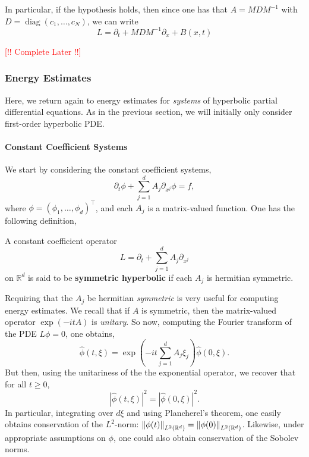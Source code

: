 \documentclass{article}
\begin{document}
In particular, if the hypothesis holds, then since one has that $A = MDM^{-1}$ with $D = \operatorname{diag}(c_{1}, \ldots, c_{N})$, we can write 
\begin{equation*}
	L = \partial_{t} + MDM^{-1}\partial_{x} + B(x, t)
\end{equation*} 

\textcolor{red}{[!! Complete Later !!]}

\subsubsection{Energy Estimates} 

Here, we return again to energy estimates for \textit{systems} of hyperbolic partial differential equations. As in the previous section, we will initially only consider first-order hyperbolic PDE. 

\paragraph{Constant Coefficient Systems} 

We start by considering the constant coefficient systems, 
\begin{equation*}
	\partial_{t}\phi + \sum_{j = 1}^{d}A_{j}\partial_{x^{j}}\phi = f, 
\end{equation*}
where $\phi = (\phi_{1}, \ldots, \phi_{d})^{\top}$, and each $A_{j}$ is a matrix-valued function. One has the following definition, 
\begin{definition}
	A constant coefficient operator 
	\begin{equation*}
		L = \partial_{t} + \sum_{j = 1}^{d}A_{j}\partial_{x^{j}} 
	\end{equation*}
	on $\mathbb{R}^{d}$ is said to be \textbf{symmetric hyperbolic} if each $A_{j}$ is hermitian symmetric. 
\end{definition} 
Requiring that the $A_{j}$ be hermitian \textit{symmetric} is very useful for computing energy estimates. We recall that if $A$ is symmetric, then the matrix-valued operator $\exp(-itA)$ is \textit{unitary}. So now, computing the Fourier transform of the PDE $L\phi = 0$, one obtains, 
\begin{equation*}
	\hat{\phi}(t,\xi) = \exp\left(-it\sum_{j = 1}^{d}A_{j}\xi_{j}\right)\hat{\phi}(0,\xi). 
\end{equation*}
But then, using the unitariness of the the exponential operator, we recover that for all $t \geq 0$, 
\begin{equation*}
	|\hat{\phi}(t,\xi)|^{2} = |\hat{\phi}(0,\xi)|^{2}. 
\end{equation*}
In particular, integrating over $d\xi$ and using Plancherel's theorem, one easily obtains conservation of the $L^2$-norm: $\left\Vert \phi(t) \right\Vert_{L^{2}(\mathbb{R}^{d})} = \left\Vert \phi(0) \right\Vert_{L^{2}(\mathbb{R}^{d})}$. Likewise, under appropriate assumptions on $\phi$, one could also obtain conservation of the Sobolev norms. 
\end{document}
